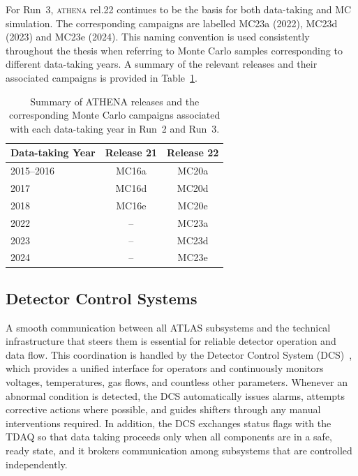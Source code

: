 For Run~3, \textsc{athena} rel.22 continues to be the basis for both data-taking and MC simulation. The corresponding campaigns are labelled MC23a (2022), MC23d (2023) and MC23e (2024). This naming convention is used consistently throughout the thesis when referring to Monte Carlo samples corresponding to different data-taking years. A summary of the relevant releases and their associated campaigns is provided in Table~\ref{tab:athena_mc_campaigns}.

\begin{table}[htbp]
    \centering
    \small
    \renewcommand{\arraystretch}{1.3} %
    \setlength{\tabcolsep}{12pt}      %
    \caption{Summary of ATHENA releases and the corresponding Monte Carlo campaigns associated with each data-taking year in Run~2 and Run~3.}
    \label{tab:athena_mc_campaigns}
    \begin{tabular}{lcc}
        \hline
        \textbf{Data-taking Year} & \textbf{Release 21} & \textbf{Release 22} \\
        \hline
        2015--2016 & MC16a & MC20a \\
        2017       & MC16d & MC20d \\
        2018       & MC16e & MC20e \\
        \hline
        2022       & --    & MC23a \\
        2023       & --    & MC23d \\
        2024       & --    & MC23e \\
        \hline
    \end{tabular}
\end{table}



\subsection{Detector Control Systems}
\label{sec:dcs}
A smooth communication between all ATLAS subsystems and the technical infrastructure that steers them is essential for reliable detector operation and data flow. This coordination is handled by the Detector Control System (DCS)~\cite{atlas_DCS}, which provides a unified interface for operators and continuously monitors voltages, temperatures, gas flows, and countless other parameters. Whenever an abnormal condition is detected, the DCS automatically issues alarms, attempts corrective actions where possible, and guides shifters through any manual interventions required. In addition, the DCS exchanges status flags with the TDAQ so that data taking proceeds only when all components are in a safe, ready state, and it brokers communication among subsystems that are controlled independently.

